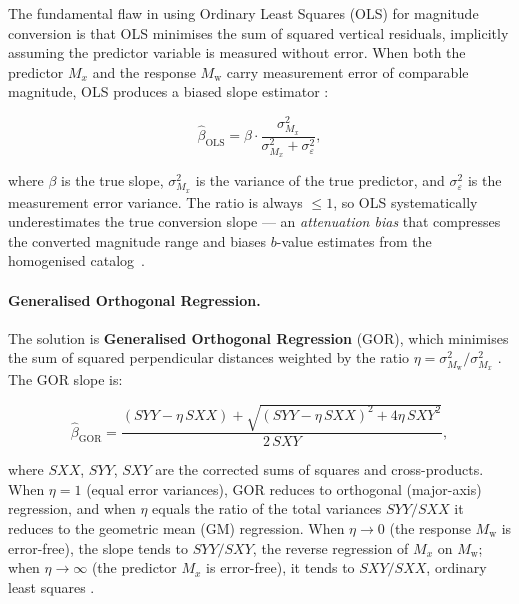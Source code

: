 \documentclass[12pt]{article}
\newcommand{\catalog}{catalog}
\begin{document}
The fundamental flaw in using Ordinary Least Squares (OLS) for magnitude
conversion is that OLS minimises the sum of squared vertical residuals,
implicitly assuming the predictor variable is measured without error.  When
both the predictor $M_x$ and the response $M_\mathrm{w}$ carry measurement
error of comparable magnitude, OLS produces a biased slope estimator
\citep{Fuller1987}:

\begin{equation}
  \hat{\beta}_{\mathrm{OLS}} = \beta \cdot \frac{\sigma_{M_x}^2}{\sigma_{M_x}^2 + \sigma_{\varepsilon}^2},
  \label{eq:olsbias}
\end{equation}

where $\beta$ is the true slope, $\sigma_{M_x}^2$ is the variance of the
true predictor, and $\sigma_{\varepsilon}^2$ is the measurement error variance.
The ratio is always $\leq 1$, so OLS systematically underestimates the true
conversion slope — an \emph{attenuation bias} that compresses the converted
magnitude range and biases $b$-value estimates from the homogenised \catalog\
\citep{Grunthal2016, Carroll2019}.

\paragraph{Generalised Orthogonal Regression.}
The solution is \textbf{Generalised Orthogonal Regression} (GOR), which
minimises the sum of squared perpendicular distances weighted by the ratio
$\eta = \sigma_{M_\mathrm{w}}^2 / \sigma_{M_x}^2$
\citep{Grunthal2016, Akkar2014, Cotton2006}.  The GOR slope is:

\begin{equation}
  \hat{\beta}_{\mathrm{GOR}} = \frac{
    (\mathit{SYY} - \eta\,\mathit{SXX}) + \sqrt{(\mathit{SYY} - \eta\,\mathit{SXX})^2 + 4\eta\,\mathit{SXY}^2}
  }{2\,\mathit{SXY}},
  \label{eq:gorslope}
\end{equation}

where $\mathit{SXX}$, $\mathit{SYY}$, $\mathit{SXY}$ are the corrected sums of
squares and cross-products.  When $\eta = 1$ (equal error variances), GOR
reduces to orthogonal (major-axis) regression, and when $\eta$ equals the ratio
of the total variances $\mathit{SYY}/\mathit{SXX}$ it reduces to the geometric
mean (GM) regression.  When $\eta \to 0$ (the response $M_\mathrm{w}$ is
error-free), the slope tends to $\mathit{SYY}/\mathit{SXY}$, the reverse
regression of $M_x$ on $M_\mathrm{w}$; when $\eta \to \infty$ (the predictor
$M_x$ is error-free), it tends to $\mathit{SXY}/\mathit{SXX}$, ordinary least
squares \citep{Fuller1987}.
\end{document}
